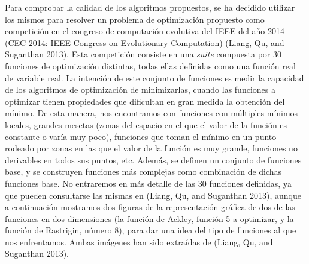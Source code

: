 \documentclass[
  a4paper,
,tablecaptionabove
]{scrartcl}
\begin{document}
Para comprobar la calidad de los algoritmos propuestos, se ha decidido
utilizar los mismos para resolver un problema de optimización propuesto
como competición en el congreso de computación evolutiva del IEEE del
año 2014 (CEC 2014: IEEE Congress on Evolutionary Computation) (Liang,
Qu, and Suganthan 2013). Esta competición consiste en una \emph{suite}
compuesta por 30 funciones de optimización distintas, todas ellas
definidas como una función real de variable real. La intención de este
conjunto de funciones es medir la capacidad de los algoritmos de
optimización de minimizarlas, cuando las funciones a optimizar tienen
propiedades que dificultan en gran medida la obtención del mínimo. De
esta manera, nos encontramos con funciones con múltiples mínimos
locales, grandes mesetas (zonas del espacio en el que el valor de la
función es constante o varía muy poco), funciones que toman el mínimo en
un punto rodeado por zonas en las que el valor de la función es muy
grande, funciones no derivables en todos sus puntos, etc. Además, se
definen un conjunto de funciones base, y se construyen funciones más
complejas como combinación de dichas funciones base. No entraremos en
más detalle de las 30 funciones definidas, ya que pueden consultarse las
mismas en (Liang, Qu, and Suganthan 2013), aunque a continuación
mostramos dos figuras de la representación gráfica de dos de las
funciones en dos dimensiones (la función de Ackley, función 5 a
optimizar, y la función de Rastrigin, número 8), para dar una idea del
tipo de funciones al que nos enfrentamos. Ambas imágenes han sido
extraídas de (Liang, Qu, and Suganthan 2013).
\end{document}
